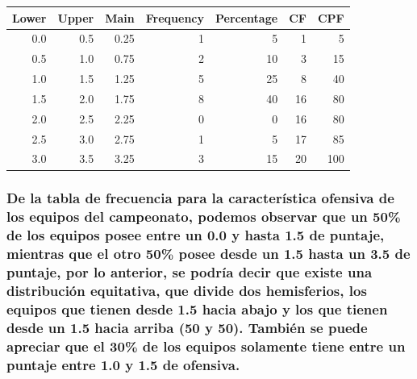 \documentclass[]{article}
\begin{document}
\begin{table}[H]
\centering
\begin{tabular}{r|r|r|r|r|r|r}
\hline
Lower & Upper & Main & Frequency & Percentage & CF & CPF\\
\hline
\rowcolor{gray!6}  0.0 & 0.5 & 0.25 & 1 & 5 & 1 & 5\\
\hline
0.5 & 1.0 & 0.75 & 2 & 10 & 3 & 15\\
\hline
\rowcolor{gray!6}  1.0 & 1.5 & 1.25 & 5 & 25 & 8 & 40\\
\hline
1.5 & 2.0 & 1.75 & 8 & 40 & 16 & 80\\
\hline
\rowcolor{gray!6}  2.0 & 2.5 & 2.25 & 0 & 0 & 16 & 80\\
\hline
2.5 & 3.0 & 2.75 & 1 & 5 & 17 & 85\\
\hline
\rowcolor{gray!6}  3.0 & 3.5 & 3.25 & 3 & 15 & 20 & 100\\
\hline
\end{tabular}
\end{table}

\hypertarget{de-la-tabla-de-frecuencia-para-la-caracteristica-ofensiva-de-los-equipos-del-campeonato-podemos-observar-que-un-50-de-los-equipos-posee-entre-un-0.0-y-hasta-1.5-de-puntaje-mientras-que-el-otro-50-posee-desde-un-1.5-hasta-un-3.5-de-puntaje-por-lo-anterior-se-podria-decir-que-existe-una-distribucion-equitativa-que-divide-dos-hemisferios-los-equipos-que-tienen-desde-1.5-hacia-abajo-y-los-que-tienen-desde-un-1.5-hacia-arriba-50-y-50.-tambien-se-puede-apreciar-que-el-30-de-los-equipos-solamente-tiene-entre-un-puntaje-entre-1.0-y-1.5-de-ofensiva.}{%
\subsubsection{De la tabla de frecuencia para la característica ofensiva
de los equipos del campeonato, podemos observar que un 50\% de los
equipos posee entre un 0.0 y hasta 1.5 de puntaje, mientras que el otro
50\% posee desde un 1.5 hasta un 3.5 de puntaje, por lo anterior, se
podría decir que existe una distribución equitativa, que divide dos
hemisferios, los equipos que tienen desde 1.5 hacia abajo y los que
tienen desde un 1.5 hacia arriba (50 y 50). También se puede apreciar
que el 30\% de los equipos solamente tiene entre un puntaje entre 1.0 y
1.5 de
ofensiva.}\label{de-la-tabla-de-frecuencia-para-la-caracteristica-ofensiva-de-los-equipos-del-campeonato-podemos-observar-que-un-50-de-los-equipos-posee-entre-un-0.0-y-hasta-1.5-de-puntaje-mientras-que-el-otro-50-posee-desde-un-1.5-hasta-un-3.5-de-puntaje-por-lo-anterior-se-podria-decir-que-existe-una-distribucion-equitativa-que-divide-dos-hemisferios-los-equipos-que-tienen-desde-1.5-hacia-abajo-y-los-que-tienen-desde-un-1.5-hacia-arriba-50-y-50.-tambien-se-puede-apreciar-que-el-30-de-los-equipos-solamente-tiene-entre-un-puntaje-entre-1.0-y-1.5-de-ofensiva.}}
\end{document}
